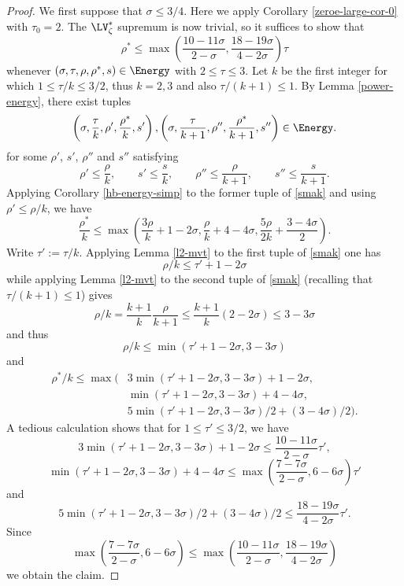 \begin{proof} We first suppose that $\sigma \leq 3/4$.  Here we apply Corollary \ref{zeroe-large-cor-0} with $\tau_0 = 2$.  The $\LV^*_\zeta$ supremum is now trivial, so it suffices to show that
\begin{equation}\label{second-claim}
        \rho^* \leq \max\left( \frac{10-11\sigma}{2-\sigma}, \frac{18-19\sigma}{4-2\sigma}\right) \tau
\end{equation}
whenever $(\sigma,\tau,\rho,\rho^*,s) \in \Energy$ with $2 \leq \tau \leq 3$.  Let $k$ be the first integer for which $1 \leq \tau/k \leq 3/2$, thus $k=2,3$ and also $\tau/(k+1) \leq 1$.  By Lemma \ref{power-energy}, there exist tuples
\begin{equation}\label{smak}
\left(\sigma, \frac{\tau}{k}, \rho', \frac{\rho^*}{k}, s'\right), \left(\sigma,\frac{\tau}{k+1}, \rho'', \frac{\rho^*}{k + 1}, s''\right)  \in \Energy.
\end{equation}
for some $\rho'$, $s'$, $\rho''$ and $s''$ satisfying
\[
\rho' \le \frac{\rho}{k},\qquad s' \le \frac{s}{k},\qquad \rho'' \le \frac{\rho}{k+1},\qquad s'' \le \frac{s}{k+1}.
\]
Applying Corollary \ref{hb-energy-simp} to the former tuple of \eqref{smak} and using $\rho' \le \rho/k$, we have
$$\frac{\rho^*}{k} \leq \max \left(\frac{3\rho}{k} + 1-2\sigma, \frac{\rho}{k} +4-4\sigma, \frac{5\rho}{2k} + \frac{3-4\sigma}{2}\right).$$
Write $\tau' := \tau/k$. Applying Lemma \ref{l2-mvt} to the first tuple of \eqref{smak} one has
$$\rho/k \leq \tau' + 1 - 2\sigma$$
while applying Lemma \ref{l2-mvt} to the second tuple of \eqref{smak} (recalling that $\tau/(k+1) \le 1$) gives
$$\rho/k = \frac{k+1}{k} \frac{\rho}{k+1} \leq \frac{k+1}{k} (2-2\sigma) \le 3-3\sigma$$
and thus
\begin{equation}\label{rho-k}
\rho/k \leq \min( \tau'+1-2\sigma, 3-3\sigma)
\end{equation}
and
\begin{equation*}
    \begin{split}
        \rho^*/k \leq \max(&3 \min(\tau'+1-2\sigma,3-3\sigma) + 1-2\sigma, \\
        &\min(\tau'+1-2\sigma,3-3\sigma) +4-4\sigma, \\
        &5\min(\tau'+1-2\sigma,3-3\sigma)/2 + (3-4\sigma)/2).
    \end{split}
\end{equation*}
A tedious calculation shows that for $1 \leq \tau' \leq 3/2$, we have
$$3 \min(\tau'+1-2\sigma,3-3\sigma) + 1-2\sigma \leq \frac{10-11\sigma}{2-\sigma} \tau',$$
$$ \min(\tau'+1-2\sigma,3-3\sigma) +4-4\sigma \leq \max\left( \frac{7-7\sigma}{2-\sigma}, 6-6\sigma\right)\tau'$$
and
$$5\min(\tau'+1-2\sigma,3-3\sigma)/2 + (3-4\sigma)/2 \leq \frac{18-19\sigma}{4-2\sigma} \tau'.$$
Since
$$\max\left( \frac{7-7\sigma}{2-\sigma}, 6-6\sigma\right) \leq \max\left(\frac{10-11\sigma}{2-\sigma}, \frac{18-19\sigma}{4-2\sigma}\right)$$
we obtain the claim.


\end{proof}
